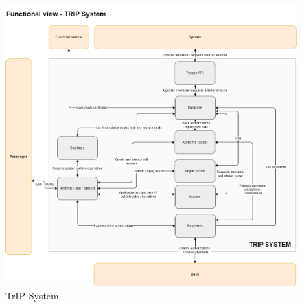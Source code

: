\begin{figure}[H]
    \centering
    \includegraphics[width=\textwidth]{drawings/views_final_version/functional_view.png}
    \caption{TrIP System.}
    \label{fig:trip_system}
\end{figure}

